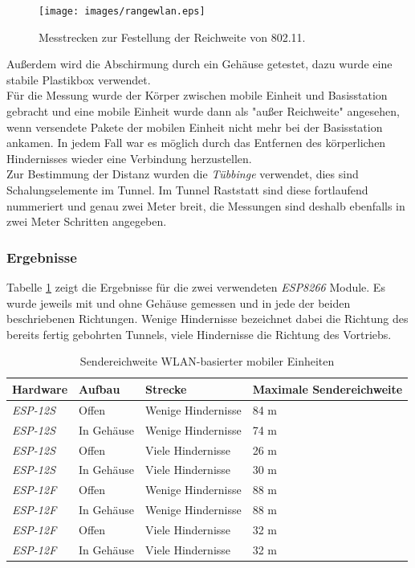 \begin{figure}[h!]
  \centering
	\texttt{[image: images/rangewlan.eps]}
  \caption{Messtrecken zur Festellung der Reichweite von 802.11.}
  \label{fig:rangewlan}
\end{figure}

Außerdem wird die Abschirmung durch ein Gehäuse getestet, dazu wurde eine stabile Plastikbox verwendet.\\
Für die Messung wurde der Körper zwischen mobile Einheit und Basisstation gebracht und eine mobile Einheit wurde dann als "{}außer Reichweite"{} angesehen, wenn versendete Pakete der mobilen Einheit nicht mehr bei der Basisstation ankamen.
In jedem Fall war es möglich durch das Entfernen des körperlichen Hindernisses wieder eine Verbindung herzustellen.\\
Zur Bestimmung der Distanz wurden die \emph{Tübbinge} verwendet, dies sind Schalungselemente im Tunnel.
Im Tunnel Raststatt sind diese fortlaufend nummeriert und genau zwei Meter breit, die Messungen sind deshalb ebenfalls in zwei Meter Schritten angegeben.

\subsubsection{Ergebnisse}
Tabelle \ref{table:rangewifi} zeigt die Ergebnisse für die zwei verwendeten \emph{ESP8266} Module.
Es wurde jeweils mit und ohne Gehäuse gemessen und in jede der beiden beschriebenen Richtungen.
Wenige Hindernisse bezeichnet dabei die Richtung des bereits fertig gebohrten Tunnels, viele Hindernisse die Richtung des Vortriebs.

\begin{table}[h]
	\centering
	\caption{Sendereichweite WLAN-basierter mobiler Einheiten}
	\label{table:rangewifi}
	\begin{tabular}{l|l|l|l}
		Hardware & Aufbau & Strecke & Maximale Sendereichweite \\
		\hline
		\emph{ESP-12S} & Offen & Wenige Hindernisse & 84 m \\
		\emph{ESP-12S} & In Gehäuse & Wenige Hindernisse & 74 m \\
		\emph{ESP-12S} & Offen & Viele Hindernisse & 26 m \\
		\emph{ESP-12S} & In Gehäuse & Viele Hindernisse & 30 m \\
		\hline
		\emph{ESP-12F} & Offen & Wenige Hindernisse & 88 m \\
		\emph{ESP-12F} & In Gehäuse & Wenige Hindernisse & 88 m \\
		\emph{ESP-12F} & Offen & Viele Hindernisse & 32 m \\
		\emph{ESP-12F} & In Gehäuse & Viele Hindernisse & 32 m \\
	\end{tabular}
\end{table}


